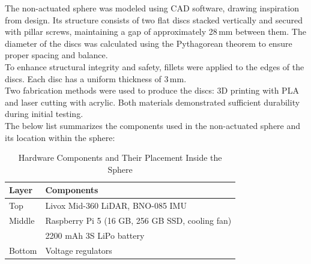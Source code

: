 \documentclass[conference]{IEEEtran}
\begin{document}
The non-actuated sphere was modeled using CAD software, drawing inspiration from \cite{Kalman_filter_sphere} design. Its structure consists of two flat discs stacked vertically and secured with pillar screws, maintaining a gap of approximately 28\,mm between them. The diameter of the discs was calculated using the Pythagorean theorem to ensure proper spacing and balance.\\
\hspace*{1em}To enhance structural integrity and safety, fillets were applied to the edges of the discs. Each disc has a uniform thickness of 3\,mm.\\
\hspace*{1em}Two fabrication methods were used to produce the discs: 3D printing with PLA and laser cutting with acrylic. Both materials demonstrated sufficient durability during initial testing.\\
\hspace*{1em}The below list summarizes the components used in the non-actuated sphere and its location within the sphere:



\begin{table}[H]
\centering
\caption{Hardware Components and Their Placement Inside the Sphere}
\label{tab:hardware_components}
\begin{tabularx}{\linewidth}{@{}l X@{}}
\toprule
\textbf{Layer} & \textbf{Components} \\
\midrule
Top    & Livox Mid-360 LiDAR, BNO-085 IMU \\
Middle & Raspberry Pi 5 (16 GB, 256 GB SSD, cooling fan) \\
       & 2200 mAh 3S LiPo battery \\
Bottom & Voltage regulators \\
\bottomrule
\end{tabularx}
\vspace{-1em}
\end{table}
\end{document}
